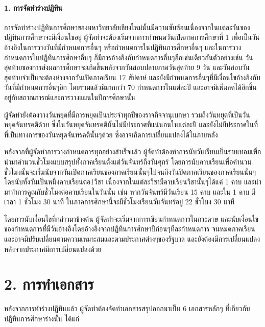 \paragraph{1. การจัดทำร่างปฏิทิน}

\par การจัดทำร่างปฏิทินการศึกษาของมหาวิทยาลัยเชียงใหม่นั้นมีความซับซ้อนเนื่องจากในแต่ละวันของปฏิทินการศึกษาจะมีเงื่อนไขอยู่ ผู้จัดทำจะต้องเริ่มจากการกำหนดวันเปิดภาคการศึกษาที่ 1 เพื่อเป็นวันอ้างอิงในการวางวันที่มีกำหนดการอื่นๆ หรือกำหนดการในปฏิทินการศึกษาอื่นๆ และในการวางกำหนดการในปฏิทินการศึกษาอื่นๆ ก็มีการอ้างอิงกับกำหนดการอื่นๆอีกเช่นเดียวกันตัวอย่างเช่น วันสุดท้ายของการส่งผลการศึกษาจะเกิดขึ้นหลังจากวันสอบปลายภาควันสุดท้าย 9 วัน และวันสอบวันสุดท้ายจำเป็นจะต้องห่างจากวันเปิดภาคเรียน 17 สัปดาห์ และยังมีกำหนดการอื่นๆที่มีเงื่อนไขอ้างอิงกับวันที่มีกำหนดการอื่นๆอีก โดยรวมแล้วมีมากกว่า 70 กำหนดการในแต่ละปี และอาจมีเพิ่มลดได้อีกขึ้นอยู่กับสถาณการณ์และการวางแผนในปีการศึกษานั้น


\par ผู้จัดทำยังต้องวางวันหยุดที่มีการหยุดเป็นประจำทุกปีของราจกิจจานุเบกษา รวมถึงวันหยุดที่เป็นวันหยุดจันทรคติด้วย ซึ่งในวันหยุดจันทรคตินั้นไม่มีประกาศที่แน่นอนในแต่ละปี และยังไม่มีประกาศในที่ที่เป็นทางการของวันหยุดจันทรคตินั้นๆด้วย ซึ่งอาจเกิดการเปลี่ยนแปลงได้ในภายหลัง

\par หลังจากที่ผู้จัดทำการวางกำหนดการทุกอย่างสำเร็จแล้ว ผู้จัดทำต้องทำการนับวันเรียนเป็นรายเทอมเพื่อนำมาคำนวนชั่วโมงแบบสรุปทั้งภาคเรียนตั้งแต่วันจันทร์ถึงวันศุกร์ โดยการนับคาบเรียนเพื่อคำนวนชั่วโมงนั้นจะเริ่มนับจากวันเปิดภาคเรียนของภาคเรียนนั้นๆไปจนถึงวันปิดภาคเรียนของภาคเรียนนั้นๆ โดยนับทั้งวันเป็นหนึ่งคาบเรียนต่อ1วิชา เนื่องจากในแต่ละวิชามีคาบเรียนวิชานั้นๆได้แค่ 1 คาบ และนำมาทำการคูณกับชั่วโมงต่อคาบเรียนในวันนั้น เช่น หากวันจันทร์มีวันเรียน 15 คาบ และใน 1 คาบ มีเวลา 1 ชั่วโมง 30 นาที ในภาคการศึกษานี้จะมีชั่วโมงเรียนวันจันทร์อยู่ 22 ชั่วโมง 30 นาที

\par โดยการนับเงื่อนไขที่กล่าวมาข้างต้น ผู้จัดทำจะเริ่มจากการเขียนกำหนดการในกระดาษ และนับเงื่อนไขของกำหนดการที่มีวันอ้างอิงโดยอ้างอิงจากปฏิทินการศึกษาปีก่อนๆทีละกำหนดการ จนหมดภาคเรียน และอาจมีปรับเปลี่ยนตามความเหมาะสมและตามประกาศต่างๆของรัฐบาล และยังต้องมีการเปลี่ยนแปลงหลังจากประกาศมีการเปลี่ยนแปลงด้วย

\section*{2. การทำเอกสาร}\enskip
\par หลังจากการทำร่างปฏิทินแล้ว ผู้จัดทำต้องจัดทำเอกสารสรุปออกมาเป็น 6 เอกสารหลักๆ ที่เกี่ยวกับปฏิทินการศึกษาร่างนั้น ได้แก่

